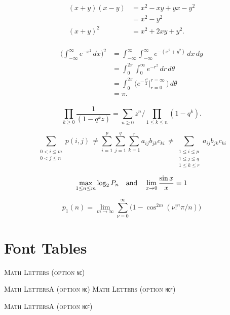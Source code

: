 \documentclass[11pt]{article}
\theoremstyle{oldplain}
\theoremstyle{plain}
\begin{document}

\begin{align*}
\begin{aligned}
(x+y)(x-y)&=x^2-xy+yx-y^2\\
&=x^2-y^2\\
(x+y)^2&=x^2+2xy+y^2.
\end{aligned}
\end{align*}


\begin{align*}
\begin{aligned}
\biggl(\int_{-\infty}^\infty e^{-x^2}\,dx\biggr)^2
&=\int_{-\infty}^\infty\int_{-\infty}^\infty e^{-(x^2+y^2)}\,dx\,dy\\
&=\int_0^{2\pi}\int_0^\infty e^{-r^2}\,dr\,d\theta\\
&=\int_0^{2\pi}\biggl(e^{-\frac{r^2}{2}}
\biggl|_{r=0}^{r=\infty}\,\biggr)\,d\theta\\
&=\pi.
\end{aligned}
\end{align*}



$$\prod_{k\ge0}\frac{1}{(1-q^kz)}=
\sum_{n\ge0}z^n\bigg/\!\!\prod_{1\le k\le n}(1-q^k).$$

$$\sum_{\substack{\scriptstyle 0< i\le m\\\scriptstyle0<j\le n}}p(i,j) \,\ne
%
%
\sum_{i=1}^p \sum_{j=1}^q \sum_{k=1}^r a_{ij} b_{jk} c_{ki} \,\ne
%
\sum_{\substack{\scriptstyle 1\le i\le p \\ \scriptstyle 1\le j\le q\\
\scriptstyle 1\le k\le r}} a_{ij} b_{jk} c_{ki}$$

$$\max_{1\le n\le m}\log_2P_n \quad \hbox{and} \quad
\lim_{x\to0}\frac{\sin x}{x}=1$$

$$p_1(n)=\lim_{m\to\infty}\sum_{\nu=0}^\infty\bigl(1-\cos^{2m}(\nu!^n\pi/n)\bigr)$$

\newpage
\section*{Font Tables}

\textsc{Math Letters (option {\tt nc})}

\newpage

\textsc{Math LettersA (option {\tt nc})}
\newpage 
\textsc{Math Letters (option {\tt ncf})}

\newpage

\textsc{Math LettersA (option {\tt ncf})}

 
\end{document}

